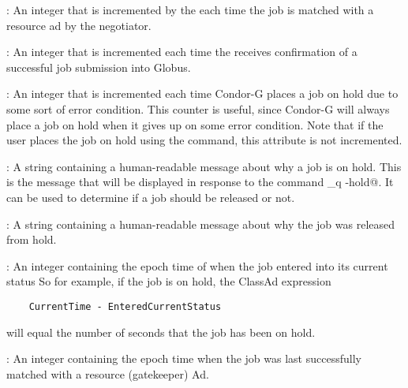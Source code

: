 \begin{description}
\item[\AdAttr{NumJobMatches}] : An integer that is incremented by the
 each time the job is matched with a resource ad by the
negotiator.

\item[\AdAttr{NumGlobusSubmits}] :  An integer that is incremented each
time the  receives confirmation of a successful job
submission into Globus.

\item[\AdAttr{NumSystemHolds}] :  An integer that is incremented each time
Condor-G places a job on hold due to some sort of error condition.  This
counter is useful, since Condor-G will always place a job on hold when it
gives up on some error condition.  Note that if the user places the job
on hold using the  command, this attribute is not incremented.

\item[\AdAttr{HoldReason}] :   A string containing a human-readable
message about why a job is on hold.
This is the message that will be displayed in response to
the command \verb@condor\_q -hold@.
It can be used to determine if a job should be released or not.

\item[\AdAttr{ReleaseReason}] :    A string containing a human-readable
message about why the job was released from hold.

\item[\AdAttr{EnteredCurrentStatus}] : An integer containing the
epoch time of when the job entered into its current status
So for example, if the job is on hold, the ClassAd expression
\begin{verbatim}
    CurrentTime - EnteredCurrentStatus
\end{verbatim}
will equal the number of seconds that the job has been on hold.

\item[\AdAttr{LastMatchTime}] : An integer containing the epoch time
when the job was last successfully matched with a resource (gatekeeper) Ad.


\end{description}
